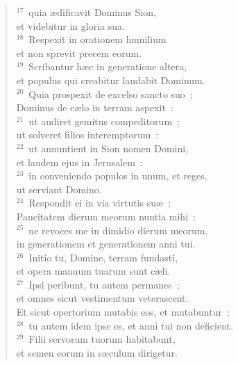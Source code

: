 \begin{verse}
${}^{17}$~quia \ae dificavit Dominus Sion,\\ et videbitur in gloria sua.\\
${}^{18}$~Respexit in orationem humilium\\ et non sprevit precem eorum.\\
${}^{19}$~Scribantur h\ae c in generatione altera,\\ et populus qui creabitur laudabit Dominum.\\
${}^{20}$~Quia prospexit de excelso sancto suo~;\\ Dominus de c\ae lo in terram aspexit~:\\
${}^{21}$~ut audiret gemitus compeditorum~;\\ ut solveret filios interemptorum~:\\
${}^{22}$~ut annuntient in Sion nomen Domini,\\ et laudem ejus in Jerusalem~:\\
${}^{23}$~in conveniendo populos in unum, et reges,\\ ut serviant Domino.\\
${}^{24}$~Respondit ei in via virtutis su\ae~:\\ Paucitatem dierum meorum nuntia mihi~:\\
${}^{25}$~ne revoces me in dimidio dierum meorum,\\ in generationem et generationem anni tui.\\
${}^{26}$~Initio tu, Domine, terram fundasti,\\ et opera manuum tuarum sunt c\ae li.\\
${}^{27}$~Ipsi peribunt, tu autem permanes~;\\ et omnes sicut vestimentum veterascent.\\ Et sicut opertorium mutabis eos, et mutabuntur~;\\
${}^{28}$~tu autem idem ipse es, et anni tui non deficient.\\
${}^{29}$~Filii servorum tuorum habitabunt,\\ et semen eorum in s\ae culum dirigetur.\end{verse}



